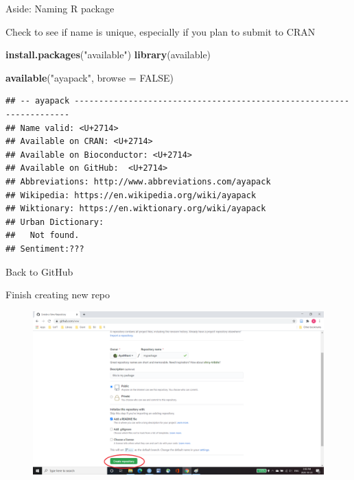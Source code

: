 \documentclass[
  ignorenonframetext,
]{beamer}
\newenvironment{Shaded}{\begin{snugshade}}{\end{snugshade}}
\newcommand{\DataTypeTok}[1]{\textcolor[rgb]{0.13,0.29,0.53}{#1}}
\newcommand{\KeywordTok}[1]{\textcolor[rgb]{0.13,0.29,0.53}{\textbf{#1}}}
\newcommand{\NormalTok}[1]{#1}
\newcommand{\OtherTok}[1]{\textcolor[rgb]{0.56,0.35,0.01}{#1}}
\newcommand{\StringTok}[1]{\textcolor[rgb]{0.31,0.60,0.02}{#1}}
\begin{document}
\begin{frame}[fragile]{Aside: Naming R package}
\protect\hypertarget{aside-naming-r-package-1}{}

Check to see if name is unique, especially if you plan to submit to CRAN
\footnotesize

\begin{Shaded}
\begin{Highlighting}[]
\KeywordTok{install.packages}\NormalTok{(}\StringTok{"available"}\NormalTok{)}
\KeywordTok{library}\NormalTok{(available)}
\end{Highlighting}
\end{Shaded}

\begin{Shaded}
\begin{Highlighting}[]
\KeywordTok{available}\NormalTok{(}\StringTok{"ayapack"}\NormalTok{, }\DataTypeTok{browse =} \OtherTok{FALSE}\NormalTok{)}
\end{Highlighting}
\end{Shaded}

\begin{verbatim}
## -- ayapack ---------------------------------------------------------------------
## Name valid: <U+2714>
## Available on CRAN: <U+2714> 
## Available on Bioconductor: <U+2714>
## Available on GitHub:  <U+2714> 
## Abbreviations: http://www.abbreviations.com/ayapack
## Wikipedia: https://en.wikipedia.org/wiki/ayapack
## Wiktionary: https://en.wiktionary.org/wiki/ayapack
## Urban Dictionary:
##   Not found.
## Sentiment:???
\end{verbatim}

\end{frame}

\begin{frame}{Back to GitHub}
\protect\hypertarget{back-to-github}{}

Finish creating new repo

\begin{figure}
  \includegraphics[scale=0.275]{slides_files/figure-beamer/GitHub_step4.png}
\end{figure}

\end{frame}
\end{document}
